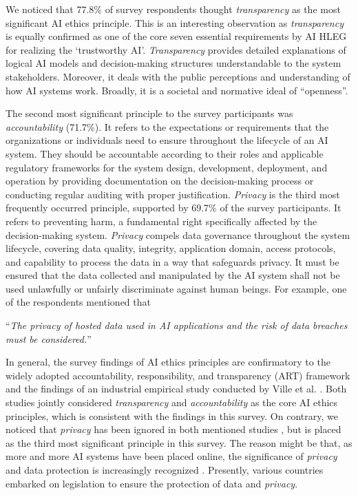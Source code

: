 We noticed that 77.8\% of survey respondents thought \textit{transparency} as the most significant AI ethics principle. This is an interesting observation as \textit{transparency} is equally confirmed as one of the core seven essential requirements by AI HLEG \cite{AR2} for realizing the ‘trustworthy AI’. \textit{Transparency} provides detailed explanations of logical AI models and decision-making structures understandable to the system stakeholders. Moreover, it deals with the public perceptions and understanding of how AI systems work. Broadly, it is a societal and normative ideal of “openness”.

The second most significant principle to the survey participants was \textit{accountability} (71.7\%). It refers to the expectations or requirements that the organizations or individuals need to ensure throughout the lifecycle of an AI system. They should be accountable according to their roles and applicable regulatory frameworks for the system design, development, deployment, and operation by providing documentation on the decision-making process or conducting regular auditing with proper justification. \textit{Privacy} is the third most frequently occurred principle, supported by 69.7\% of the survey participants. It refers to preventing harm, a fundamental right specifically affected by the decision-making system. \textit{Privacy} compels data governance throughout the system lifecycle, covering data quality, integrity, application domain, access protocols, and capability to process the data in a way that safeguards privacy. It must be ensured that the data collected and manipulated by the AI system shall not be used unlawfully or unfairly discriminate against human beings. For example, one of the respondents mentioned that 

\faComment{} “\textit{The privacy of hosted data used in AI applications and the risk of data breaches must be considered.}” 

In general, the survey findings of AI ethics principles are confirmatory to the widely adopted accountability, responsibility, and transparency (ART) framework \cite{AR15} and the findings of an industrial empirical study conducted by Ville et al. \cite{AR10}. Both studies \cite{AR10} \cite{AR15} jointly considered \textit{transparency} and \textit{accountability} as the core AI ethics principles, which is consistent with the findings in this survey. On contrary, we noticed that \textit{privacy} has been ignored in both mentioned studies \cite{AR10} \cite{AR15}, but is placed as the third most significant principle in this survey. The reason might be that, as more and more AI systems have been placed online, the significance of \textit{privacy} and data protection is increasingly recognized \cite{bansal2022internet}. Presently, various countries embarked on legislation to ensure the protection of data and \textit{privacy}.


